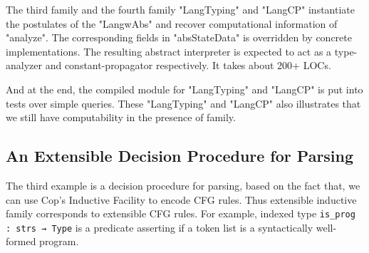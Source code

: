 The third family and the fourth family "LangTyping" and "LangCP" instantiate the postulates of the
"LangwAbs" and recover computational information of "analyze". The corresponding fields in "absStateData" is overridden by concrete implementations. The resulting abstract interpreter is expected
to act as a type-analyzer and constant-propagator respectively. It takes about 200+ LOCs. 


And at the end, the compiled module for "LangTyping" and "LangCP" is put into tests over simple queries. These "LangTyping" and "LangCP" also illustrates that we still have
computability in the presence of family.

\subsection{An Extensible Decision Procedure for Parsing}
\label{sec:coqexample-parser}
The third example is a decision procedure for parsing, based on the fact that, we can use Cop's Inductive Facility to encode CFG rules. Thus extensible inductive family corresponds to extensible CFG rules. For example, indexed type \texttt{is_prog : strs → Type} is a predicate asserting if a token list is a syntactically well-formed program.

